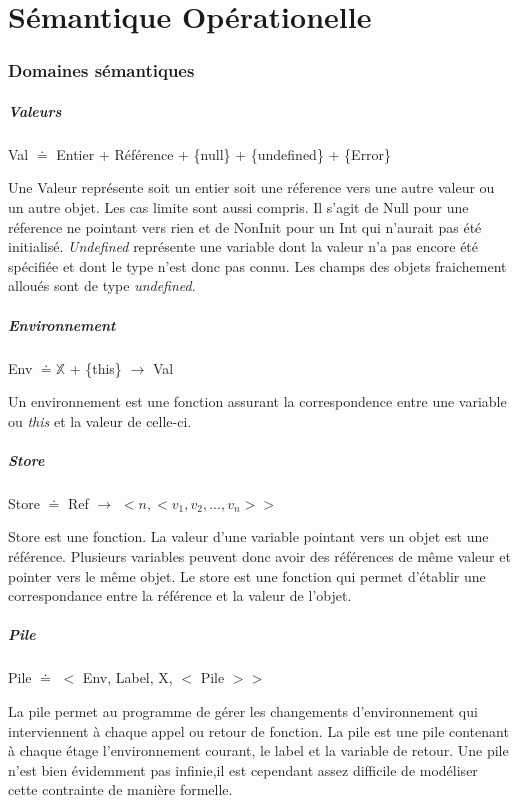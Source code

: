 \chapter{Sémantique Opérationelle}


\subsection{Domaines sémantiques}
\paragraph{Valeurs} Val $\doteq$ Entier + Référence + \{null\} + \{undefined\} + \{Error\}

Une Valeur représente soit un entier soit une réference vers une autre valeur
ou un autre objet. Les cas limite sont aussi compris. Il s'agit de Null pour 
une réference ne pointant vers rien  et de NonInit pour un Int qui n'aurait 
pas été initialisé. \emph{Undefined} représente une variable dont la valeur n'a
pas encore été spécifiée et dont le type n'est donc pas connu. Les champs
des objets fraichement alloués sont de type \emph{undefined}.

\paragraph{Environnement} Env $\doteq \mathbb{X}$ + \{this\} $\rightarrow$ Val

Un environnement est une fonction assurant la correspondence entre une variable ou \emph{this} et la valeur de celle-ci.

\paragraph{Store} Store $\doteq$ Ref $\rightarrow$ $<n,<v_1,v_2,...,v_n> >$	%

Store est une fonction. La valeur d'une variable pointant vers un objet est une référence. Plusieurs 
variables peuvent donc avoir des références de même valeur et pointer vers le 
même objet. Le store est une fonction qui permet d'établir une correspondance 
entre la référence et la valeur de l'objet.

\paragraph{Pile} Pile $\doteq$ $<$ Env, Label, X, $<$ Pile $> >$ 

La pile permet au programme de gérer les changements d'environnement qui interviennent
à chaque appel ou retour de fonction. La pile est une pile contenant à chaque étage 
l'environnement courant, le label et la variable de retour. Une pile n'est bien évidemment pas infinie,il est cependant assez difficile de modéliser cette contrainte de manière formelle.

